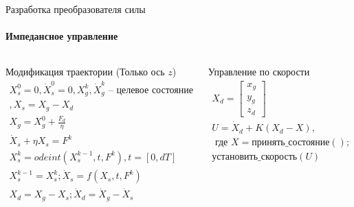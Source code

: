 \documentclass[aspectratio=169,xcolor=table]{beamer}
\begin{document}
\begin{frame}[t]{Разработка преобразователя силы}
    \framesubtitle{Импедансное управление}
    \vspace{-18pt}
    \begin{columns}[T,onlytextwidth]
        \begin{column}{0.55\textwidth}
            \begin{exampleblock}{Модификация траектории (Только ось $z$)}
                \vspace{-14pt}
                \begin{eqnarray*}
                    X_s^0 = 0, \dot{X}_s^0 =0,  X_g^k, \dot{X}_g^k \text{ -- целевое состояние}\\, X_s = X_g - X_d \\
                    X_g = X_g^0 + \frac{F_d}{\eta } \\
                    \dot{X}_s + \eta  X_s = F^k \\
                    X_s^k = odeint(X_s^{k-1},t,F^k), t = [0,dT] \\
                    X_s^{k-1} = X_s^k;  \dot{X}_s = f(X_s,t,F^k) \\
                    X_d = X_g - X_s; \dot{X}_d = \dot{X}_g - \dot{X}_s
                \end{eqnarray*}
            \end{exampleblock}
        \end{column}
        \begin{column}{0.40\textwidth}
            \begin{exampleblock}{Управление по скорости}
                \vspace{-14pt}
                \begin{eqnarray*}
                    X_d = \begin{bmatrix}
                        x_g \\ y_g \\ z_d
                    \end{bmatrix} \\
                    U = \dot{X}_d + K(X_d - X), \\ \text{ где } X=\text{принять\_состояние}(); \\
                    \text{установить\_скорость}(U)
                \end{eqnarray*}
            \end{exampleblock}
        \end{column}
    \end{columns}
\end{frame}
\end{document}
